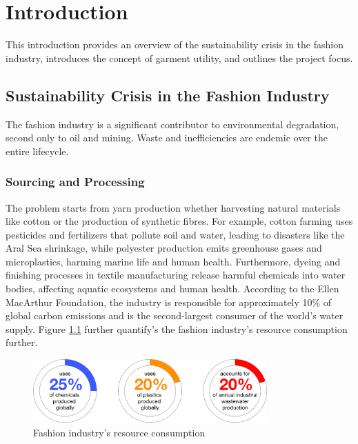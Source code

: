 \chapter{Introduction}

This introduction provides an overview of the sustainability crisis in the fashion industry, introduces the concept of garment utility, and outlines the project focus.

\section{Sustainability Crisis in the Fashion Industry}
The fashion industry is a significant contributor to environmental degradation, second only to oil and mining. Waste and inefficiencies are endemic over the entire lifecycle. 
\subsection{Sourcing and Processing}
The problem starts from yarn production whether harvesting natural materials like cotton or the production of synthetic fibres. For example, cotton farming uses pesticides and fertilizers that pollute soil and water, leading to disasters like the Aral Sea shrinkage, while polyester production emits greenhouse gases and microplastics, harming marine life and human health. Furthermore, dyeing and finishing processes in textile manufacturing release harmful chemicals into water bodies, affecting aquatic ecosystems and human health. According to the Ellen MacArthur Foundation, the industry is responsible for approximately 10\% of global carbon emissions and is the second-largest consumer of the world's water supply. Figure \ref{fig:resource_consumption} further quantify's the fashion industry's resource consumption further.
\begin{figure} [H]
    \centering
    \includegraphics[width=0.8\textwidth]{Images/sourcing donuts.png}
    \caption{Fashion industry's resource consumption \cite{charter_accelerating_2024}}
    \label{fig:resource_consumption}
\end{figure}
